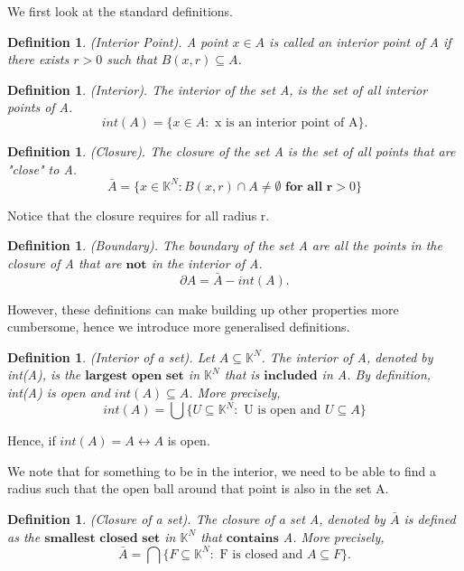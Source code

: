\documentclass[twoside]{article}
\newtheorem{definition}[theorem]{Definition}
\begin{document}
We first look at the standard definitions.

\begin{definition}(Interior Point). A point $x \in A$ is called an interior point of A if there exists $r > 0$ such that $B(x,r) \subseteq A$.
\end{definition}

\begin{definition}(Interior). The interior of the set A, is the set of all interior points of A.
$$
int(A) = \{x \in A: \text{ x is an interior point of A}\}.
$$
\end{definition}

\begin{definition}(Closure). The closure of the set A is the set of all points that are "close" to A. 
$$
\bar{A} = \{x \in \mathbb{K}^N: B(x,r) \cap A \neq \emptyset \textbf{ for all r} > 0\}
$$
\end{definition}

Notice that the closure requires for all radius r.

\begin{definition}(Boundary). The boundary of the set A are all the points in the closure of A that are $\textbf{not}$ in the interior of A.
$$
\partial A = \bar{A} - int(A).
$$
\end{definition}

However, these definitions can make building up other properties more cumbersome, hence we introduce more generalised definitions.

\begin{definition}(Interior of a set). Let $A \subseteq \mathbb{K}^N$. The interior of A, denoted by int(A), is the $\textbf{largest open set}$ in $\mathbb{K}^N$ that is $\textbf{included}$ in A. By definition, int(A) is open and $int(A) \subseteq A$. More precisely,
$$
int(A) = \bigcup\{U \subseteq \mathbb{K}^{N}: \text{ U is open and }U \subseteq A\}
$$
\end{definition}

Hence, if $int(A) = A \leftrightarrow A$ is open. 

We note that for something to be in the interior, we need to be able to find a radius such that the open ball around that point is also in the set A.

\begin{definition}(Closure of a set). The closure of a set A, denoted by $\bar{A}$ is defined as the $\textbf{smallest closed set}$ in $\mathbb{K}^N$ that $\textbf{contains}$ A. More precisely,
$$
\bar{A} = \bigcap\{F \subseteq \mathbb{K}^N: \text{ F is closed and } A \subseteq F\}.
$$
\end{definition}
\end{document}
